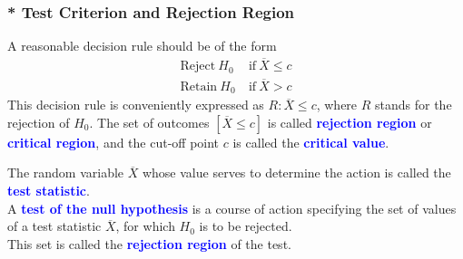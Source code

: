 \documentclass[12pt,a4paper]{article}
\begin{document}
\subsubsection*{* Test Criterion and Rejection Region}
A reasonable decision rule should be of the form \begin{align*}
\text{Reject}\ H_0\ &\text{if}\ \overline{X}\leq c \\
\text{Retain}\ H_0\ &\text{if}\ \overline{X}> c
\end{align*} This decision rule is conveniently expressed as $R:\overline{X}\leq c$, where $R$ stands for the rejection of $H_0$. The set of outcomes $[\overline{X}\leq c ]$ is called \textcolor{blue}{\bf rejection region} or \textcolor{blue}{\bf critical region}, and the cut-off point $c$ is called the \textcolor{blue}{\bf critical value}.
\\
\begin{tcolorbox}[colback=white]
The random variable $\overline{X}$ whose value serves to determine the action is called the 
\textcolor{blue}{\bf test statistic}. \\ 
A \textcolor{blue}{\bf test of the null hypothesis} is a course of action specifying the set of values of a test statistic $\overline{X}$, for which $H_0$ is to be rejected. \\
This set is called the \textcolor{blue}{\bf rejection region} of the test.
\end{tcolorbox}
\end{document}
